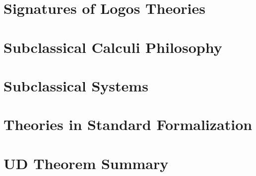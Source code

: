 \documentclass{report}
\begin{document}
\chapter{Signatures of Logos Theories}


\chapter{Subclassical Calculi Philosophy}


\chapter{Subclassical Systems}


\chapter{Theories in Standard Formalization}


\chapter{UD Theorem Summary}

\end{document}
